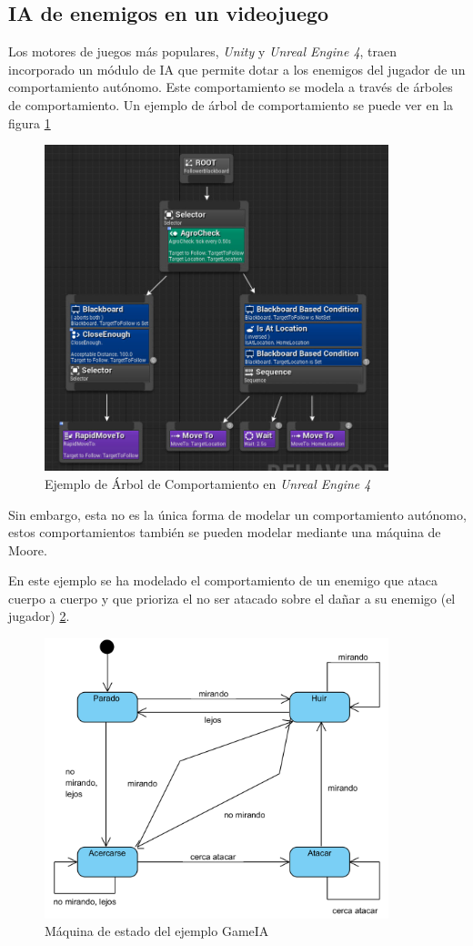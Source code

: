 \documentclass{pre-tfg}
\begin{document}
\subsection{IA de enemigos en un videojuego}
Los motores de juegos más populares, \emph{Unity} y \emph{Unreal Engine 4}, traen incorporado un módulo de IA que permite dotar a los enemigos del jugador de un comportamiento autónomo. Este comportamiento se modela a través de árboles de comportamiento. Un ejemplo de árbol de comportamiento se puede ver en la figura \ref{fig:UE4BT}

\begin{figure}[h]
    \centering
    \includegraphics[width=10cm]{figures/UnrealBehaviourTree.jpg}
    \caption{Ejemplo de Árbol de Comportamiento en \emph{Unreal Engine 4}}
    \label{fig:UE4BT}
\end{figure}

Sin embargo, esta no es la única forma de modelar un comportamiento autónomo, estos comportamientos también se pueden modelar mediante una máquina de Moore.

En este ejemplo se ha modelado el comportamiento de un enemigo que ataca cuerpo a cuerpo y que prioriza el no ser atacado sobre el dañar a su enemigo (el jugador) \ref{fig:state_machine_ia}.

\begin{figure}[b]
    \centering
    \includegraphics[width=10cm]{figures/statemachineia.png}
    \caption{Máquina de estado del ejemplo GameIA}
    \label{fig:state_machine_ia}
\end{figure}
\end{document}
